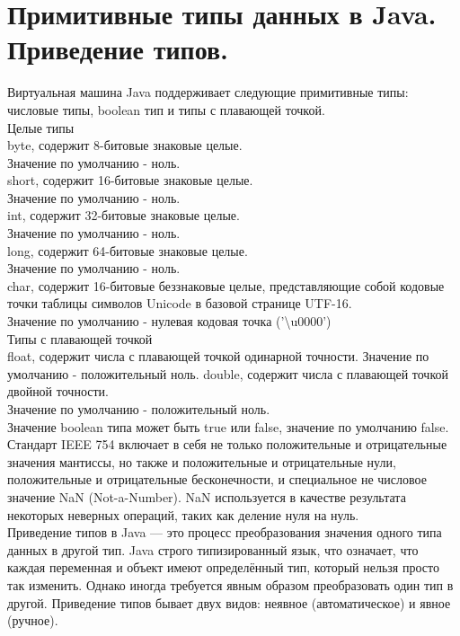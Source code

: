 \section{Примитивные типы данных в Java. Приведение типов.} 
\normalsize{Виртуальная машина Java поддерживает следующие примитивные типы: числовые типы, boolean тип и типы с плавающей точкой.\\
Целые типы \\
byte, содержит 8-битовые знаковые целые. \\
Значение по умолчанию - ноль.\\
short, содержит 16-битовые знаковые целые. \\
Значение по умолчанию - ноль.\\
int, содержит 32-битовые знаковые целые. \\
Значение по умолчанию - ноль.\\
long, содержит 64-битовые знаковые целые. \\
Значение по умолчанию - ноль.\\
char, содержит 16-битовые беззнаковые целые, представляющие собой кодовые точки таблицы символов Unicode в базовой странице UTF-16. \\
Значение по умолчанию - нулевая кодовая точка ('\textbackslash u0000')}\\
Типы с плавающей точкой \\
float, содержит числа с плавающей точкой одинарной точности. 
Значение по умолчанию - положительный ноль.
double, содержит числа с плавающей точкой двойной точности. \\
Значение по умолчанию - положительный ноль.\\
Значение  boolean  типа может быть  true  или  false, значение по умолчанию  false.  \\
Стандарт IEEE 754 включает в себя не только положительные и отрицательные значения мантиссы, но также и положительные и отрицательные нули, положительные и отрицательные  бесконечности, и специальное не числовое значение NaN (Not-a-Number). NaN используется в качестве результата некоторых неверных операций, таких как деление нуля на нуль. \\
Приведение типов в Java — это процесс преобразования значения одного типа данных в другой тип. Java строго типизированный язык, что означает, что каждая переменная и объект имеют определённый тип, который нельзя просто так изменить. Однако иногда требуется явным образом преобразовать один тип в другой. Приведение типов бывает двух видов: неявное (автоматическое) и явное (ручное). \\
